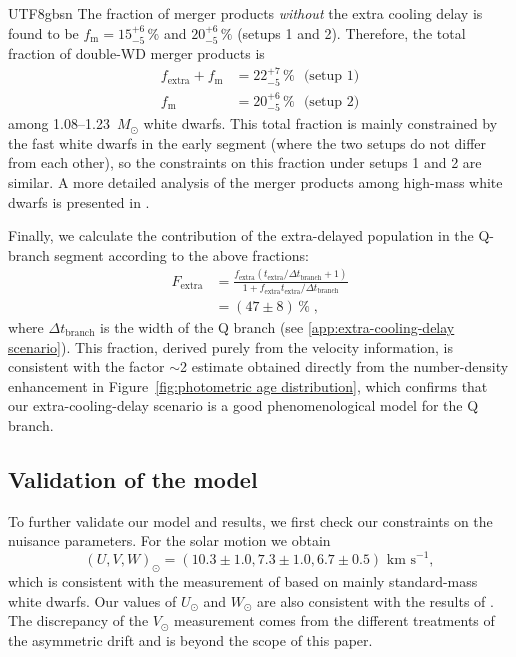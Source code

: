 \documentclass[twocolumn, times, trackchanges]{aastex63_bren}
\begin{document}
\begin{CJK*}{UTF8}{gbsn}
The fraction of merger products \emph{without} the extra cooling delay is found to be $f_\text{m}=15^{+6}_{-5}\,\%$ and $20^{+6}_{-5}\,\%$ (setups 1 and 2). Therefore, the total fraction of double-WD merger products is
\begin{align}
\label{eq:f_m}
    f_\text{extra}+f_\text{m}&=22^{+7}_{-5}\,\%\text{~ (setup 1)}\nonumber\\
    f_\text{m}&=20^{+6}_{-5}\,\%\text{~ (setup 2)}
\end{align}
among 1.08--1.23~$M_\odot$ white dwarfs. This total fraction is mainly constrained by the fast white dwarfs in the early segment (where the two setups do not differ from each other), so the constraints on this fraction under setups 1 and 2 are similar. A more detailed analysis of the merger products among high-mass white dwarfs is presented in \citet{Cheng_2019b}.

Finally, we calculate the contribution of the extra-delayed population in the Q-branch segment according to the above fractions:
\begin{align}
    F_\text{extra}&=\frac{f_\text{extra}(t_\text{extra}/\Delta t_\text{branch}+1)}{1+f_\text{extra}t_\text {extra}/\Delta t_\text{branch}}\nonumber\\
    &= (47\pm8)\,\%\;,
\end{align}
where $\Delta t_\text{branch}$ is the width of the Q branch (see \ref{app:extra-cooling-delay scenario}). This fraction, derived purely from the velocity information, is consistent with the factor $\sim$2 estimate obtained directly from the number-density enhancement in  Figure~\ref{fig:photometric age distribution}, which confirms that our extra-cooling-delay scenario is a good phenomenological model for the Q branch.


\subsection{Validation of the model}
\label{sec:validation}

To further validate our model and results, we first check our constraints on the nuisance parameters. For the solar motion we obtain
\begin{equation}
    (U,V,W)_\odot=(10.3\pm1.0, 7.3\pm1.0, 6.7\pm0.5)\text{~km s}^{-1},
\end{equation}
which is consistent with the measurement of \citet{Rowell_2019} based on mainly standard-mass white dwarfs. Our values of $U_\odot$ and $W_\odot$ are also consistent with the results of \citet{Schonrich_2010}. The discrepancy of the $V_\odot$ measurement comes from the different treatments of the asymmetric drift and is beyond the scope of this paper.


\end{CJK*}
\end{document}

